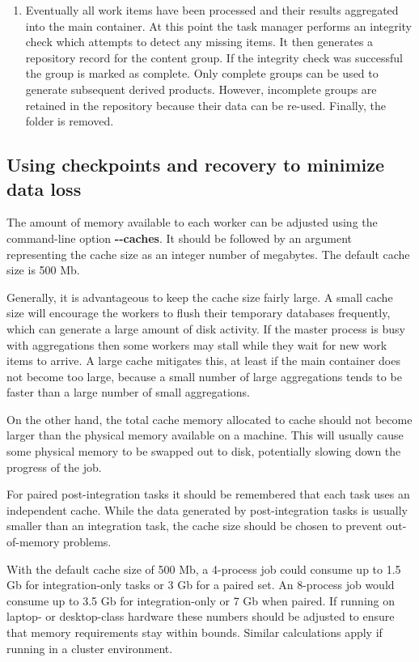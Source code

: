 \documentclass[11pt,a4paper]{article}
\renewcommand{\texttt}[1]{{\ttfamily\fontseries{l}\selectfont{#1}}}
\newcounter{advancedbox}[section]
\newenvironment{advanced}[1]{\stepcounter{advancedbox}\begin{tcolorbox}[enhanced,breakable,colback=red!10,colbacktitle=red!20,colframe=red!40,coltitle=black,title={Advanced usage: {#1}},fonttitle=\sffamily\fontseries{b}\selectfont]}{\end{tcolorbox}}
\newcommand{\file}[1]{\texttt{{#1}}}
\newcommand{\option}[1]{{\ttfamily\bfseries\small #1}}
\begin{document}
\begin{enumerate}
    \item Eventually all work items have been processed
    and their results aggregated into the main container.
    At this point the task manager performs an integrity check
    which attempts to detect any missing items.
    It then generates a repository record for the content group.
    If the integrity check was successful the group is marked
    as complete.
    Only complete groups can be used to generate subsequent
    derived products.
    However,
    incomplete groups are retained in the repository because their
    data can be re-used.
    Finally, the \file{tempfiles} folder is removed.
\end{enumerate}

\subsection{Using checkpoints and recovery to minimize data loss}
The amount of memory available to each worker can be adjusted using
the command-line option
\option{{-}{-}caches}.
It should be followed by an argument representing the cache size
as an integer number of megabytes.
The default cache size is 500 Mb.

Generally, it is advantageous to keep the cache size fairly large.
A small cache size will encourage the workers to flush their
temporary databases frequently, which can generate a large amount
of disk activity.
If the master process is busy with aggregations then
some workers may stall while they wait for new work items to arrive.
A large cache mitigates this, at least if the main container
does not become too large, because a small number of
large aggregations tends to be faster than a large number of small
aggregations.

On the other hand, the total cache memory
allocated to cache should not become larger than the physical
memory available on a machine.
This will usually cause some physical memory to be swapped
out to disk, potentially slowing down the progress of the job.

\begin{advanced}{Estimating cache requirements with paired tasks}
    For paired post-integration tasks it should be remembered that
    each task uses an independent cache.
    While the data generated by post-integration tasks is usually
    smaller than an integration task, the cache size should be
    chosen to prevent out-of-memory problems.
    
    With the default cache size of 500 Mb, a 4-process job could
    consume up to 1.5 Gb for integration-only tasks
    or 3 Gb for a paired set.
    An 8-process job would consume up to 3.5 Gb for
    integration-only or 7 Gb when paired.
    If running on laptop- or desktop-class hardware these numbers
    should be adjusted to ensure that memory requirements stay within
    bounds.
    Similar calculations apply if running in a cluster environment.
\end{advanced}
\end{document}
